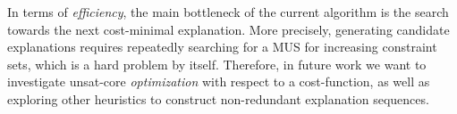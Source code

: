 In terms of \emph{efficiency}, the main bottleneck of the current algorithm is the search towards the next cost-minimal explanation. More precisely, generating candidate explanations requires repeatedly searching for a MUS for increasing constraint sets, which is a hard problem by itself.
Therefore, in future work we want to investigate unsat-core \emph{optimization} with respect to a cost-function, as well as exploring other heuristics to construct non-redundant explanation sequences.%